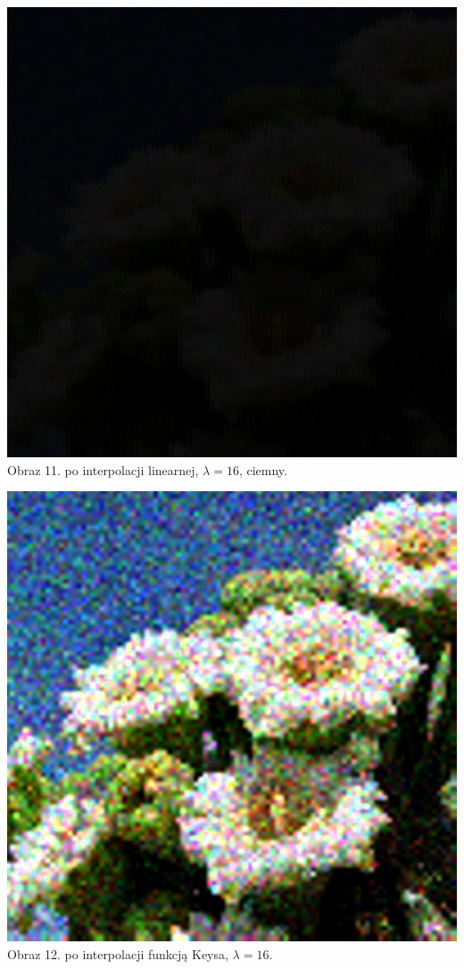 \documentclass[14pt]{article}
\begin{document}
\begin{center}
    \vspace{0.5cm}
    \includegraphics[scale=0.15]{images/Poisson_bilinear_dark_16x.jpg}
    \\ \small Obraz 11. po interpolacji linearnej, 
    $\lambda = 16$, ciemny.

    \vspace{0.5cm}
    \includegraphics[scale=0.15]{images/Poisson_keys_16x.jpg}
    \\ \small Obraz 12. po interpolacji funkcją Keysa, 
    $\lambda = 16$.


\end{center}
\end{document}
